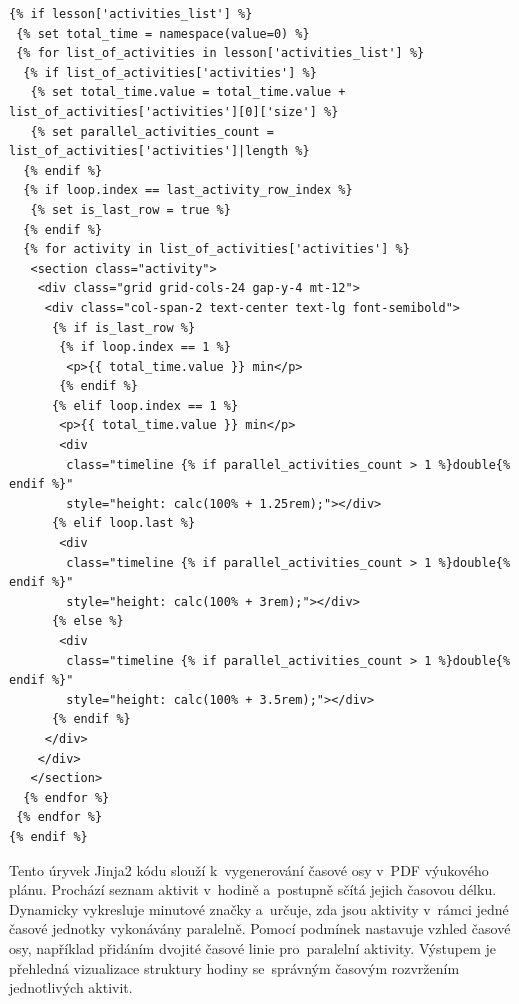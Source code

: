 \documentclass[male,czech,api_bc]{kitheses}
\begin{document}
\begin{lstlisting}
{% if lesson['activities_list'] %}
 {% set total_time = namespace(value=0) %}
 {% for list_of_activities in lesson['activities_list'] %}
  {% if list_of_activities['activities'] %}
   {% set total_time.value = total_time.value + list_of_activities['activities'][0]['size'] %}
   {% set parallel_activities_count = list_of_activities['activities']|length %}
  {% endif %}
  {% if loop.index == last_activity_row_index %}
   {% set is_last_row = true %}
  {% endif %}
  {% for activity in list_of_activities['activities'] %}
   <section class="activity">
    <div class="grid grid-cols-24 gap-y-4 mt-12">
     <div class="col-span-2 text-center text-lg font-semibold">
      {% if is_last_row %}
       {% if loop.index == 1 %}
        <p>{{ total_time.value }} min</p>
       {% endif %}
      {% elif loop.index == 1 %}
       <p>{{ total_time.value }} min</p>
       <div 
        class="timeline {% if parallel_activities_count > 1 %}double{% endif %}"
        style="height: calc(100% + 1.25rem);"></div>
      {% elif loop.last %}
       <div
        class="timeline {% if parallel_activities_count > 1 %}double{% endif %}"
        style="height: calc(100% + 3rem);"></div>
      {% else %}
       <div
        class="timeline {% if parallel_activities_count > 1 %}double{% endif %}"
        style="height: calc(100% + 3.5rem);"></div>
      {% endif %}
     </div>
    </div>
   </section>
  {% endfor %}
 {% endfor %}
{% endif %}
\end{lstlisting}

Tento úryvek Jinja2 kódu slouží k~vygenerování časové osy v~PDF výukového plánu. Prochází seznam aktivit v~hodině a~postupně sčítá jejich časovou délku. Dynamicky vykresluje minutové značky a~určuje, zda jsou aktivity v~rámci jedné časové jednotky vykonávány paralelně. Pomocí podmínek nastavuje vzhled časové osy, například přidáním dvojité časové linie pro~paralelní aktivity. Výstupem je přehledná vizualizace struktury hodiny se~správným časovým rozvržením jednotlivých aktivit.
\end{document}
